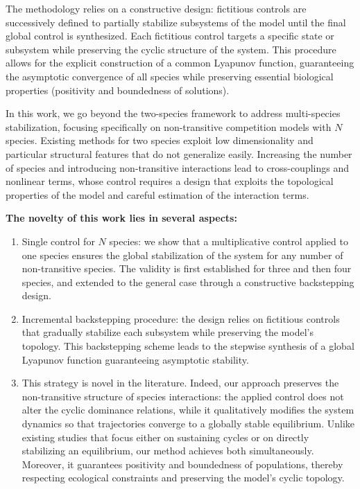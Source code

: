 \documentclass[10pt, a4paper]{amsart}
\theoremstyle{plain}
\theoremstyle{definition}
\theoremstyle{remark}
\numberwithin{equation}{section}
\begin{document}
\begin{itemize}
The methodology relies on a constructive design: fictitious controls are successively defined to partially stabilize subsystems of the model until the final global control is synthesized. Each fictitious control targets a specific state or subsystem while preserving the cyclic structure of the system. This procedure allows for the explicit construction of a common Lyapunov function, guaranteeing the asymptotic convergence of all species while preserving essential biological properties (positivity and boundedness of solutions).

In this work, we go beyond the two-species framework to address multi-species stabilization, focusing specifically on non-transitive competition models with $N$ species. Existing methods for two species exploit low dimensionality and particular structural features that do not generalize easily. Increasing the number of species and introducing non-transitive interactions lead to cross-couplings and nonlinear terms, whose control requires a design that exploits the topological properties of the model and careful estimation of the interaction terms.

{\bf The novelty of this work lies in several aspects:}

\begin{enumerate}
\item[*] Single control for $N$ species: we show that a multiplicative control applied to one species ensures the global stabilization of the system for any number of non-transitive species. The validity is first established for three and then four species, and extended to the general case through a constructive backstepping design.

\item[*]  Incremental backstepping procedure: the design relies on fictitious controls that gradually stabilize each subsystem while preserving the model’s topology. This backstepping scheme leads to the stepwise synthesis of a global Lyapunov function guaranteeing asymptotic stability.

\item[*] This strategy is novel in the literature. Indeed, our approach preserves the non-transitive structure of species interactions: the applied control does not alter the cyclic dominance relations, while it qualitatively modifies the system dynamics so that trajectories converge to a globally stable equilibrium. Unlike existing studies that focus either on sustaining cycles or on directly stabilizing an equilibrium, our method achieves both simultaneously. Moreover, it guarantees positivity and boundedness of populations, thereby respecting ecological constraints and preserving the model’s cyclic topology.%


\end{enumerate}
\end{itemize}
\end{document}
